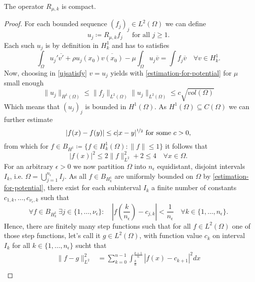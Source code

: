 \begin{theorem} \label{3.1:thm-Rmuk.isCompact} %
	The operator $R_{\mu, k}$ is compact.

	\begin{proof}
	For each bounded sequence $(f_{j})_{j} \in L^{2}(\Omega)$ we can define
		\[ u_{j} \coloneqq R_{\mu, k} f_{j} \quad \text{ for all } j \geq 1. \]
	Each such $u_{j}$ is by definition in $H^{1}_{k}$ and has to satisfies 
		\begin{equation}
			\int_{\Omega} u_{j}' \overline{v'} + \rho u_{j}(x_{0}) \overline{v(x_{0})} - \mu \int_{\Omega} u_{j} \overline{v} = \int f_{j} \overline{v} \quad \forall v \in H^{1}_{k}. \label{ujsatisfy}
		\end{equation} 
	Now, choosing in \eqref{ujsatisfy} $v = u_{j}$ yields with \eqref{estimation-for-potential} for $\mu$ small enough
		\[  \| u_{j} \|_{H^{1}(\Omega)} \leq \| f_{j} \|_{L^{2}(\Omega)} \| u_{j} \|_{L^{2}(\Omega)} \leq c \sqrt{vol(\Omega)} \]
	Which means that $(u_{j})_{j}$ is bounded in $H^{1}(\Omega)$. As $H^1(\Omega) \subseteq C(\Omega)$ we can further estimate
		\begin{equation}
			|f(x) - f(y)| \leq c |x - y|^{\nicefrac{1}{2}} \text{ for some } c > 0, \label{eq:H1estimation}
		\end{equation}  
	from which for $f \in B_{H^{1}} \coloneqq \{ f \in H^{1}_{k}(\Omega) : \| f \| \leq 1 \}$ it follows that 
		\[ |f(x)|^{2} \leq 2 \| f \|^{2}_{L^{2}} + 2 \leq 4 \quad \forall x \in \Omega. \]
	For an arbitrary $\epsilon > 0$ we now partition $\Omega$ into $n_{\epsilon}$ equidistant, disjoint intervals $I_{k}$, i.e. $\Omega = \bigcup_{j = 1}^{n_{\epsilon}} I_{j}$. As all $f \in B_{H^{1}_{k}}$ are uniformly bounded on $\Omega$ by \eqref{estimation-for-potential}, there exist for each subinterval $I_{k}$ a finite number of constants $c_{1, k}, \dotsc, c_{\nu_{\epsilon}, k}$ such that %
			$$ \forall f \in B_{H^{1}_{k}} ~\exists j \in \{1, \dotsc, \nu_{\epsilon} \}: \quad \left|f\left(\frac{k}{n_{\epsilon}}\right) - c_{j, k}\right| < \frac{1}{n_{\epsilon}} \quad \forall k \in \{ 1 , \dotsc, n_{\epsilon} \}. $$	
	Hence, there are finitely many step functions such that for all $f \in L^{2}(\Omega)$ one of those step functions, let's call it $g \in L^{2}(\Omega)$, with function value $c_{k}$ on interval $I_{k}$ for all $k \in \{ 1, \dotsc, n_{\epsilon} \}$ sucht that
		\begin{align*}
			\| f - g \|^{2}_{L^{2}} & = \sum_{k = 0}^{n-1} \int_{\frac{k}{n}}^{\frac{k+1}{n}} | f(x) - c_{k+1} |^{2} dx \\

\end{align*}
\end{proof}
\end{theorem}
